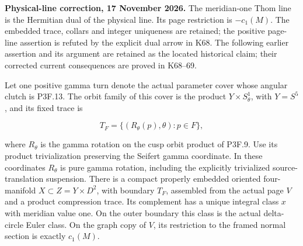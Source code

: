 \begin{theorem}\label{night:P3K.6}
\par\noindent\textbf{Physical-line correction, 17 November 2026.} The meridian-one Thom line is the Hermitian dual of the physical line. Its page restriction is \(-c_1(M)\). The embedded trace, collars and integer uniqueness are retained; the positive page-line assertion is refuted by the explicit dual arrow in K68. The following earlier assertion and its argument are retained as the located historical claim; their corrected current consequences are proved in K68--69.\medskip\par 
Let one positive gamma turn denote the actual parameter cover whose
angular clutch is P3F.13.  The orbit family of this cover is the product
\(Y\times S^1_\theta\), with \(Y=S^5\), and its fixed trace is

\[
 T_F=\{(R_\theta(p),\theta):p\in F\},
\]

where \(R_\theta\) is the gamma rotation on the cusp orbit product of
P3F.9.  Use its product trivialization preserving the Seifert gamma
coordinate.  In these coordinates \(R_\theta\) is pure gamma
rotation, including the explicitly trivialized source-translation
suspension.  There is a compact properly embedded oriented four-manifold
\(X\subset Z=Y\times D^2\), with boundary \(T_F\), assembled from the
actual page \(V\) and a product compression trace.  Its complement
has a unique integral class \(x\) with meridian value one.  On the
outer boundary this class is the actual delta-circle Euler class.
On the graph copy of \(V\), its restriction to the framed normal
section is exactly \(c_1(M)\).
\end{theorem}

